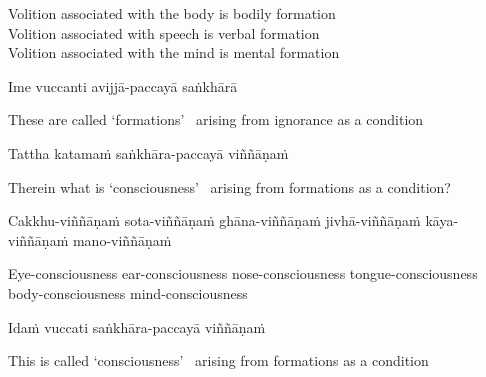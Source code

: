 \begin{english-verses}
  Volition associated with the body is bodily formation\\
  Volition associated with speech is verbal formation\\
  Volition associated with the mind is mental\makeatletter\hyperlink{endnote79-appendix}\makeatother \thinspace
  formation
\end{english-verses}

Ime vuccanti avijjā-paccayā saṅkhārā

\begin{english-hang}
  These are called `formations' \breathmark\ arising from ignorance as a condition
\end{english-hang}

Tattha katamaṁ saṅkhāra-paccayā viññāṇaṁ

\begin{english-hang}
  Therein what is `consciousness' \breathmark\ arising from formations as a condition?
\end{english-hang}

\begin{pali-hang}
  Cakkhu-viññāṇaṁ sota-viññāṇaṁ ghāna-viññāṇaṁ jivhā-viññāṇaṁ kāya-viññāṇaṁ mano-viññāṇaṁ
\end{pali-hang}

\begin{english-hang}
  Eye-consciousness ear-consciousness nose-consciousness tongue-consciousness body-consciousness mind-consciousness
\end{english-hang}

Idaṁ vuccati saṅkhāra-paccayā viññāṇaṁ

\begin{english-hang}
  This is called `consciousness' \breathmark\ arising from formations as a condition
\end{english-hang}

